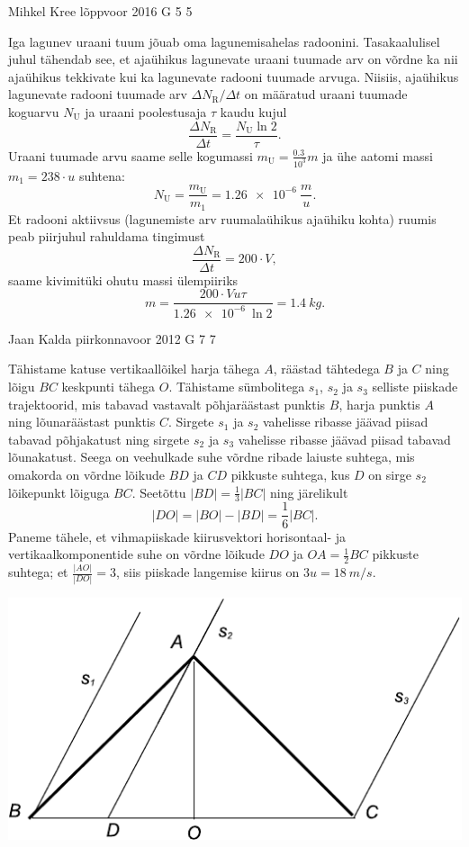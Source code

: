 \documentclass[11pt, twoside]{article}
\begin{document}
{%
{Mihkel Kree} %
{lõppvoor} %
{2016} %
{G 5} %
{5} %
{

\ifSolution
Iga lagunev uraani tuum jõuab oma lagunemisahelas radoonini. Tasakaalulisel juhul tähendab see, et ajaühikus lagunevate uraani tuumade arv on võrdne ka nii ajaühikus tekkivate kui ka lagunevate radooni tuumade arvuga. Niisiis, ajaühikus lagunevate radooni tuumade arv $\Delta N_\text{R} / \Delta t$ on määratud uraani tuumade koguarvu $N_\text{U}$ ja uraani poolestusaja $\tau$ kaudu kujul
\[
\frac{\Delta N_\text{R}}{\Delta t} = \frac{N_\text{U} \ln 2}{\tau}.
\]
Uraani tuumade arvu saame selle kogumassi $m_\text{U} = \frac{\SI{0.3}{}}{10^3} m$ ja ühe aatomi massi $m_1=238 \cdot u$ suhtena:
\[
N_\text{U}=\frac{m_\text{U}}{m_1}=\SI{1.26e-6}{} \frac{m}{u}.
\]
Et radooni aktiivsus (lagunemiste arv ruumalaühikus ajaühiku kohta) ruumis peab piirjuhul rahuldama tingimust
\[
\frac{\Delta N_\text{R}}{\Delta t} = 200\cdot V,
\]
saame kivimitüki ohutu massi ülempiiriks
\[
m = \frac{200\cdot V u \tau}{\SI{1.26e-6}{}\ln 2}=\SI{1.4}{kg}.
\]
\fi
}

{Jaan Kalda} %
{piirkonnavoor} %
{2012} %
{G 7} %
{7} %
{

\ifSolution
Tähistame katuse vertikaallõikel harja tähega $A$, räästad tähtedega $B$ ja $C$ ning lõigu $BC$ keskpunti tähega $O$. 
Tähistame sümbolitega $s_1$, $s_2$ ja $s_3$ selliste piiskade trajektoorid, mis tabavad vastavalt põhjaräästast punktis $B$, harja punktis $A$ ning lõunaräästast punktis $C$. Sirgete $s_1$ ja $s_2$ vahelisse ribasse jäävad piisad tabavad põhjakatust ning sirgete $s_2$ ja $s_3$ vahelisse ribasse jäävad 
piisad tabavad lõunakatust. Seega on veehulkade suhe võrdne ribade laiuste suhtega, mis omakorda on võrdne lõikude $BD$ ja $CD$ pikkuste suhtega, kus $D$ on sirge $s_2$ lõikepunkt lõiguga $BC$. Seetõttu $|BD|=\frac 13 |BC|$ ning järelikult
\[
|DO|=|BO|-|BD|=\frac 16 |BC|.
\]
Paneme tähele, et vihmapiiskade 
kiirusvektori horisontaal- ja vertikaalkomponentide suhe on võrdne lõikude $DO$ ja $OA=\frac 12 BC$ pikkuste suhtega; et $\frac {|AO|}{|DO|}=3$, siis piiskade 
langemise kiirus on $3u=\SI{18}{m/s}$.

\begin{center}
\includegraphics[width=0.5\linewidth]{2012-v2g-07-katus}
\end{center}
\fi
}

}
\end{document}
